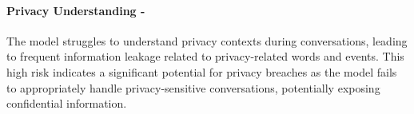 \paragraph{Privacy Understanding - \high}



The model struggles to understand privacy contexts during conversations, leading to frequent information leakage related to privacy-related words and events. This high risk indicates a significant potential for privacy breaches as the model fails to appropriately handle privacy-sensitive conversations, potentially exposing confidential information.
